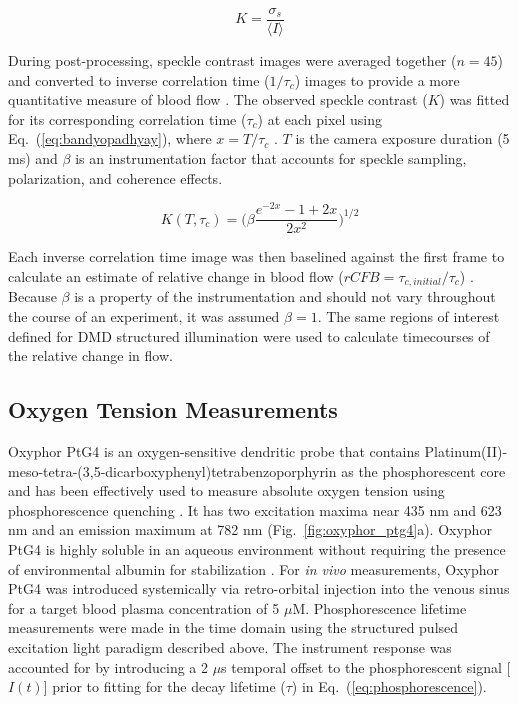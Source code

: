 \documentclass[12pt]{spieman}  %
\begin{document}
\begin{spacing}{2}
\begin{equation}
    \label{eq:speckle_contrast}
    K = \frac{\sigma_{s}}{\langle{I}\rangle}
\end{equation}

During post-processing, speckle contrast images were averaged together ($n = 45$) and converted to inverse correlation time ($1 / \tau_c$) images to provide a more quantitative measure of blood flow \cite{Briers:2001hy}. The observed speckle contrast ($K$) was fitted for its corresponding correlation time ($\tau_{c}$) at each pixel using Eq.~(\ref{eq:bandyopadhyay}), where $x = T / \tau_c$ \cite{Bandyopadhyay:2005bg}. $T$ is the camera exposure duration (5 ms) and $\beta$ is an instrumentation factor that accounts for speckle sampling, polarization, and coherence effects.

\begin{equation}
    \label{eq:bandyopadhyay}
    K(T,\tau_{c}) = \bigg(\beta \frac{e^{-2x} - 1 + 2x}{2x^{2}}\bigg)^{1/2}
\end{equation}

Each inverse correlation time image was then baselined against the first frame to calculate an estimate of relative change in blood flow ($rCFB = \tau_{c,initial}/\tau_c$) \cite{Kazmi:2015du}. Because $\beta$ is a property of the instrumentation and should not vary throughout the course of an experiment, it was assumed $\beta = 1$. The same regions of interest defined for DMD structured illumination were used to calculate timecourses of the relative change in flow.


\subsection{Oxygen Tension Measurements}
Oxyphor PtG4 is an oxygen-sensitive dendritic probe that contains Platinum(II)-meso-tetra-(3,5-dicarboxyphenyl)tetrabenzoporphyrin as the phosphorescent core \cite{Lebedev:2009cf,Esipova:2011hi} and has been effectively used to measure absolute oxygen tension using phosphorescence quenching \cite{Zhang:2013cd,Holt:2014cy}. It has two excitation maxima near 435 nm and 623 nm and an emission maximum at 782 nm (Fig.~\ref{fig:oxyphor_ptg4}a). Oxyphor PtG4 is highly soluble in an aqueous environment without requiring the presence of environmental albumin for stabilization \cite{Esipova:2011hi}. For \textit{in vivo} measurements, Oxyphor PtG4 was introduced systemically via retro-orbital injection into the venous sinus for a target blood plasma concentration of 5 $\mu$M. Phosphorescence lifetime measurements were made in the time domain using the structured pulsed excitation light paradigm described above. The instrument response was accounted for by introducing a 2 $\mu$s temporal offset to the phosphorescent signal [$I(t)$] prior to fitting for the decay lifetime ($\tau$) in Eq.~(\ref{eq:phosphorescence}).


\end{spacing}
\end{document}
